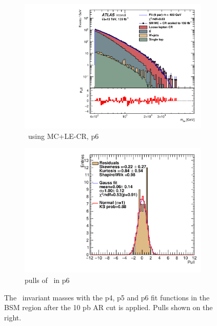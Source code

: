 \begin{figure}[H]
\begin{subfigure}[h]{0.38\linewidth}
    \includegraphics[scale=0.3]{figs/ch6/fit/variable_nosmooth/p6/10PB/output_SMMCplusCR_Mbe_p6.pdf}%
    \caption{\mbe \ using MC+LE-CR, p6}
    \end{subfigure}
    \hfill
    \begin{subfigure}[h]{0.4\linewidth}
    \includegraphics[scale=0.32]{figs/ch6/fit/variable_nosmooth/p6/10PB/pull_SMMCplusCR_Mbe_p6.pdf}%
    \caption{pulls of \mbe \ in p6}
    \end{subfigure}
    \hfill
    \caption{The \mbe \ invariant masses with the p4, p5 and p6 fit functions in the BSM region after the 10 pb AR cut is applied. Pulls shown on the right.}
\label{fig:mbe-fit-pulls}
\end{figure}

\newpage


